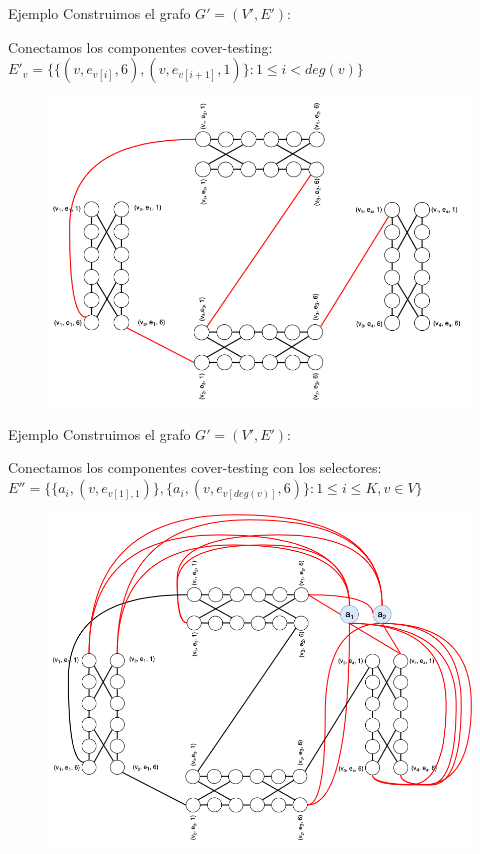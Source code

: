 \documentclass{beamer}
\begin{document}
\begin{frame}{Ejemplo}
    Construimos el grafo $G' = (V', E')$:
    \begin{block}{}
        Conectamos los componentes cover-testing: $E'_v = \{\{(v, e_{v[i]}, 6), (v, e_{v[i+1]},1)\} : 1 \le i < deg(v)\}$
    \end{block}
    \begin{figure}
        \centering
        \includegraphics[scale=0.23]{images/example-4.png}
    \end{figure}
\end{frame}

\begin{frame}{Ejemplo}
    Construimos el grafo $G' = (V', E')$:
    \begin{block}{}
        Conectamos los componentes cover-testing con los selectores:  
        $E'' = \{\{a_i, (v,e_{v[1], 1})\},\{a_i, (v,e_{v[deg(v)]}, 6)\} : 1 \le i \le K, v \in V \}$
    \end{block}
    \begin{figure}
        \centering
        \includegraphics[scale=0.23]{images/example-5.png}
    \end{figure}
\end{frame}
\end{document}
